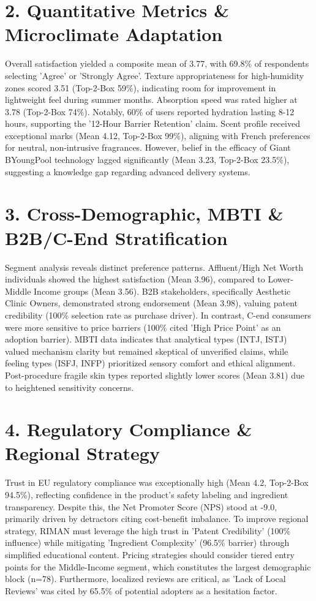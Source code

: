 \documentclass[10pt,twocolumn,a4paper]{article}
\begin{document}
\section{2. Quantitative Metrics \& Microclimate Adaptation}
Overall satisfaction yielded a composite mean of 3.77, with 69.8\% of respondents selecting 'Agree' or 'Strongly Agree'. Texture appropriateness for high-humidity zones scored 3.51 (Top-2-Box 59\%), indicating room for improvement in lightweight feel during summer months. Absorption speed was rated higher at 3.78 (Top-2-Box 74\%). Notably, 60\% of users reported hydration lasting 8-12 hours, supporting the '12-Hour Barrier Retention' claim. Scent profile received exceptional marks (Mean 4.12, Top-2-Box 99\%), aligning with French preferences for neutral, non-intrusive fragrances. However, belief in the efficacy of Giant BYoungPool technology lagged significantly (Mean 3.23, Top-2-Box 23.5\%), suggesting a knowledge gap regarding advanced delivery systems.
\section{3. Cross-Demographic, MBTI \& B2B/C-End Stratification}
Segment analysis reveals distinct preference patterns. Affluent/High Net Worth individuals showed the highest satisfaction (Mean 3.96), compared to Lower-Middle Income groups (Mean 3.56). B2B stakeholders, specifically Aesthetic Clinic Owners, demonstrated strong endorsement (Mean 3.98), valuing patent credibility (100\% selection rate as purchase driver). In contrast, C-end consumers were more sensitive to price barriers (100\% cited 'High Price Point' as an adoption barrier). MBTI data indicates that analytical types (INTJ, ISTJ) valued mechanism clarity but remained skeptical of unverified claims, while feeling types (ISFJ, INFP) prioritized sensory comfort and ethical alignment. Post-procedure fragile skin types reported slightly lower scores (Mean 3.81) due to heightened sensitivity concerns.
\section{4. Regulatory Compliance \& Regional Strategy}
Trust in EU regulatory compliance was exceptionally high (Mean 4.2, Top-2-Box 94.5\%), reflecting confidence in the product's safety labeling and ingredient transparency. Despite this, the Net Promoter Score (NPS) stood at -9.0, primarily driven by detractors citing cost-benefit imbalance. To improve regional strategy, RIMAN must leverage the high trust in 'Patent Credibility' (100\% influence) while mitigating 'Ingredient Complexity' (96.5\% barrier) through simplified educational content. Pricing strategies should consider tiered entry points for the Middle-Income segment, which constitutes the largest demographic block (n=78). Furthermore, localized reviews are critical, as 'Lack of Local Reviews' was cited by 65.5\% of potential adopters as a hesitation factor.
\end{document}
